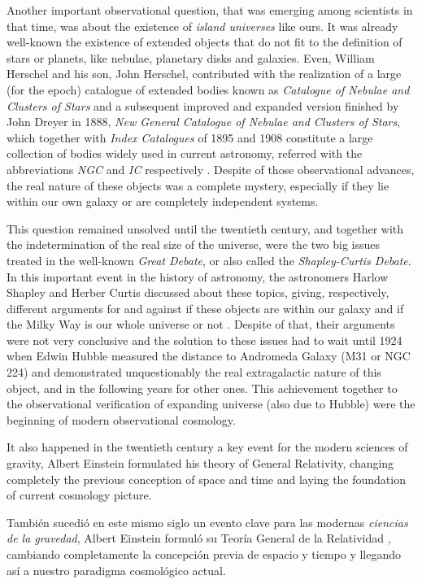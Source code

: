Another important observational question, that was emerging among 
scientists in that time, was about the existence of \textit{island 
universes} like ours. It was already well-known the existence of extended 
objects that do not fit to the definition of stars or planets, like nebulae, 
planetary disks and galaxies. Even, William Herschel and his son, John 
Herschel, contributed with the realization of a large (for the epoch) 
catalogue of extended bodies known as \textit{Catalogue of Nebulae and 
Clusters of Stars} and a subsequent improved and expanded version finished 
by John Dreyer in 1888, \textit{New General Catalogue of Nebulae and 
Clusters of Stars}, which together with \textit{Index Catalogues} of 1895 
and 1908 constitute a large collection of bodies widely used in current 
astronomy, referred with the abbreviations \textit{NGC} and \textit{IC} 
respectively \cite{longair2008}. Despite of those observational advances, 
the real nature of these objects was a complete mystery, especially if they 
lie within our own galaxy or are completely independent systems. 


This question remained unsolved until the twentieth century, and together 
with the indetermination of the real size of the universe, were the two 
big issues treated in the well-known \textit{Great Debate}, or also called 
the \textit{Shapley-Curtis Debate}. In this important event in the history 
of astronomy, the astronomers Harlow Shapley and Herber Curtis discussed 
about these topics, giving, respectively, different arguments for and 
against if these objects are within our galaxy and if the Milky Way is our 
whole universe or not \cite{Curtis1921} \cite{Shapley1921}. Despite of that, their arguments were not very
conclusive and the solution to these issues had to wait until 1924 when 
Edwin Hubble measured the distance to Andromeda Galaxy (M31 or NGC 224)
and demonstrated unquestionably the real extragalactic nature of this 
object, and in the following years for other ones. This achievement together
to the observational verification of expanding universe (also due to Hubble)
were the beginning of modern observational cosmology.



It also happened in the twentieth century a key event for the modern 
sciences of gravity, Albert Einstein formulated his theory of General 
Relativity, changing completely the previous conception of space and time 
and laying the foundation of current cosmology picture.

También sucedió en este mismo siglo un evento clave para las modernas 
\textit{ciencias de la gravedad}, Albert Einstein formuló su Teoría
General de la Relatividad \cite{Einstein1916}, cambiando completamente 
la concepción previa de espacio y tiempo y llegando así a nuestro paradigma 
cosmológico actual.



